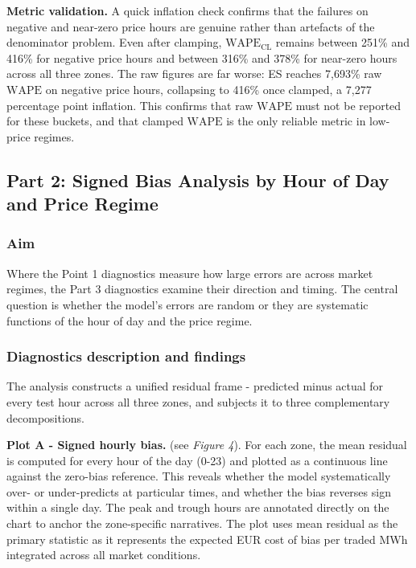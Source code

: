 \documentclass[12pt, a4paper]{article}
\newcommand{\WAPE}{\text{WAPE}}
\newcommand{\WAPECL}{\text{WAPE}_{\text{CL}}}
\begin{document}
\textbf{Metric validation. }A quick inflation check confirms that the failures on negative and
near-zero price hours are genuine rather than artefacts of the denominator
problem. Even after clamping, $\WAPECL$ remains between 251\% and 416\% for
negative price hours and between 316\% and 378\% for near-zero hours across all
three zones. The raw figures are far worse: ES reaches 7,693\% raw $\WAPE$ on
negative price hours, collapsing to 416\% once clamped, a 7,277 percentage point
inflation. This confirms that raw $\WAPE$ must not be reported for these buckets,
and that clamped $\WAPE$ is the only reliable metric in low-price regimes.


\subsection{Part 2: Signed Bias Analysis by Hour of Day and Price Regime}

\subsubsection{Aim}

Where the Point 1 diagnostics measure how large errors are across market regimes,
the Part 3 diagnostics examine their direction and timing. The central question is
whether the model's errors are random or they are systematic functions of the hour
of day and the price regime.

\subsubsection{Diagnostics description and findings}

The analysis constructs a unified residual frame - predicted minus actual for
every test hour across all three zones, and subjects it to three complementary
decompositions.

\textbf{Plot A - Signed hourly bias.} (see \emph{Figure 4}).
For each zone, the mean residual is computed
for every hour of the day (0-23) and plotted as a continuous line against the
zero-bias reference. This reveals whether the model systematically over- or
under-predicts at particular times, and whether the bias reverses sign within a
single day. The peak and trough hours are annotated directly on the chart to
anchor the zone-specific narratives. The plot uses mean residual as the primary
statistic as it represents the expected EUR cost of bias per traded MWh integrated
across all market conditions.
\end{document}
